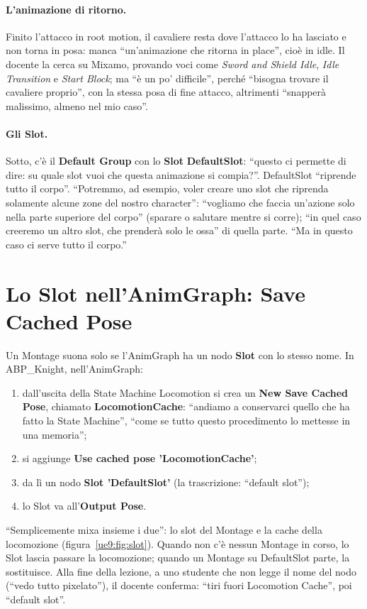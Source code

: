 \paragraph{L'animazione di ritorno.} Finito l'attacco in root motion, il cavaliere resta dove l'attacco lo ha lasciato e non
torna in posa: manca ``un'animazione che ritorna in place'', cioè in idle. Il docente la
cerca su Mixamo, provando voci come \emph{Sword and Shield Idle}, \emph{Idle
Transition} e \emph{Start Block}; ma ``è un po' difficile'', perché ``bisogna trovare
il cavaliere proprio'', con la stessa posa di fine attacco, altrimenti ``snapperà
malissimo, almeno nel mio caso''.

\paragraph{Gli Slot.} Sotto, c'è il \textbf{Default Group} con lo \textbf{Slot}
\textbf{DefaultSlot}: ``questo ci permette di dire: su quale slot vuoi che questa
animazione si compia?''. DefaultSlot ``riprende tutto il corpo''. ``Potremmo, ad esempio,
voler creare uno slot che riprenda solamente alcune zone del nostro character'': ``vogliamo
che faccia un'azione solo nella parte superiore del corpo'' (sparare o salutare mentre si
corre); ``in quel caso creeremo un altro slot, che prenderà solo le ossa'' di quella
parte. ``Ma in questo caso ci serve tutto il corpo.''

\section{Lo Slot nell'AnimGraph: Save Cached Pose}
\label{ue9:sec:slot}

Un Montage suona solo se l'AnimGraph ha un nodo \textbf{Slot} con lo stesso nome. In
ABP\_Knight, nell'AnimGraph:
\begin{enumerate}
  \item dall'uscita della State Machine Locomotion si crea un \textbf{New Save Cached
        Pose}, chiamato \textbf{LocomotionCache}: ``andiamo a conservarci quello che ha
        fatto la State Machine'', ``come se tutto questo procedimento lo mettesse in una
        memoria'';
  \item si aggiunge \textbf{Use cached pose 'LocomotionCache'};
  \item da lì un nodo \textbf{Slot 'DefaultSlot'} (la trascrizione: ``default slot'');
  \item lo Slot va all'\textbf{Output Pose}.
\end{enumerate}
``Semplicemente mixa insieme i due'': lo slot del Montage e la cache della locomozione
(figura~\ref{ue9:fig:slot}). Quando non c'è nessun Montage in corso, lo Slot lascia
passare la locomozione; quando un Montage su DefaultSlot parte, la sostituisce. Alla
fine della lezione, a uno studente che non legge il nome del nodo (``vedo tutto
pixelato''), il docente conferma: ``tiri fuori Locomotion Cache'', poi ``default slot''.

